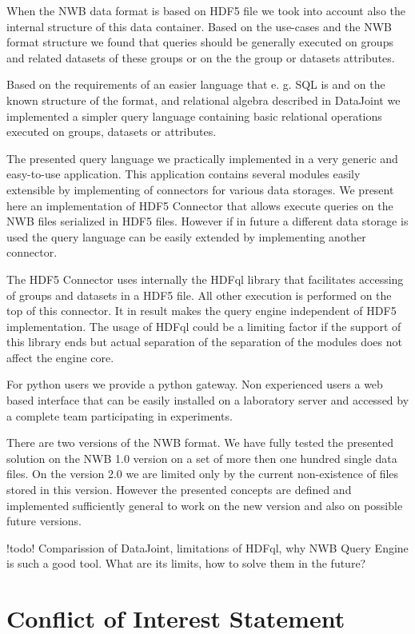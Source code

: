 \documentclass[utf8]{frontiersSCNS} %
\begin{document}
When the NWB data format is based on HDF5 file we took into account also the internal structure of this data container. Based on the use-cases and the NWB format structure we found that queries should be generally executed on groups and related datasets of these groups or on the the group or datasets attributes.

Based on the requirements of an easier language that e. g. SQL is and on the known structure of the format, and relational algebra described in DataJoint we implemented a simpler query language containing basic relational operations executed on groups, datasets or attributes.

The presented query language we practically implemented in a very generic and easy-to-use application. This application contains several modules easily extensible by implementing of connectors for various data storages. We present here an implementation of HDF5 Connector that allows execute queries on the NWB files serialized in HDF5 files. However if in future a different data storage is used the query language can be easily extended by implementing another connector.

The HDF5 Connector uses internally the HDFql library that facilitates accessing of groups and datasets in a HDF5 file. All other execution is performed on the top of this connector. It in result makes the query engine independent of HDF5 implementation. The usage of HDFql could be a limiting factor if the support of this library ends but actual separation of the separation of the modules does not affect the engine core. 

For python users we provide a python gateway. Non experienced users a web based interface that can be easily installed on a laboratory server and accessed by a complete team participating in experiments.

There are two versions of the NWB format. We have fully tested the presented solution on the NWB 1.0 version on a set of more then one hundred single data files. On the version 2.0 we are limited only by the current non-existence of files stored in this version. However the presented concepts are defined and implemented sufficiently general to work on the new version and also on possible future versions.

!todo! Comparission of DataJoint, limitations of HDFql, why NWB Query Engine is such a good tool. What are its limits, how to solve them in the future?


\section*{Conflict of Interest Statement}
\end{document}
